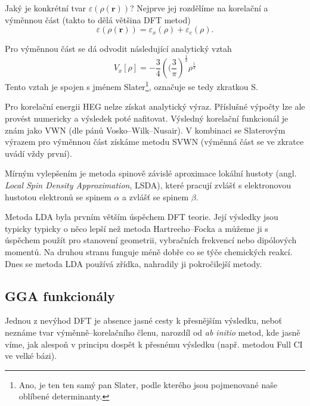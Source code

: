 Jaký je konkrétní tvar $\varepsilon(\rho(\textbf{r}))$? Nejprve jej rozdělíme na korelační a výměnnou část (takto to dělá většina DFT metod)
\begin{equation}
\varepsilon(\rho(\textbf{r}))=\varepsilon_x(\rho)+\varepsilon_c(\rho) .
\end{equation}

\noindent Pro výměnnou část se dá odvodit následující analytický vztah
\begin{equation}
V_x[\rho]=-\frac{3}{4}\left((\frac{3}{\pi}\right)^{\frac{1}{3}}\rho^{\frac{1}{3}}
\end{equation}
Tento vztah je spojen s jménem Slater\footnote{Ano, je ten ten samý pan Slater, podle kterého jsou pojmenované naše oblíbené determinanty.}, označuje se tedy zkratkou S.

Pro korelační energii HEG nelze získat analytický výraz. Příslušné výpočty lze ale provést numericky a výsledek poté nafitovat. Výsledný korelační funkcionál je znám jako VWN (dle pánů Vosko--Wilk--Nusair). V kombinaci se Slaterovým výrazem pro výměnnou část získáme metodu SVWN (výměnná část se ve zkratce uvádí vždy první).

Mírným vylepšením je metoda spinově závislé aproximace lokální hustoty (angl. \textit{Local Spin Density Approximation}, LSDA), které pracují zvlášť s elektronovou hustotou elektronů se spinem $\alpha$ a zvlášť se spinem $\beta$.

Metoda LDA byla prvním větším úspěchem DFT teorie. Její výsledky jsou typicky typicky o něco lepší než metoda Hartreeho--Focka a můžeme ji s úspěchem použít pro stanovení geometrii, vybračních frekvencí nebo dipólových momentů. Na druhou stranu funguje méně dobře co se týče chemických reakcí. Dnes se metoda LDA používá zřídka, nahradily ji pokročilejší metody.

\subsection{GGA funkcionály}
Jednou z nevýhod DFT je absence jasné cesty k přesnějším výsledku, neboť neznáme tvar výměnně--korelačního členu, narozdíl od \textit{ab initio} metod, kde jasně víme, jak alespoň v principu dospět k přesnému výsledku (např. metodou Full CI ve velké bázi).

